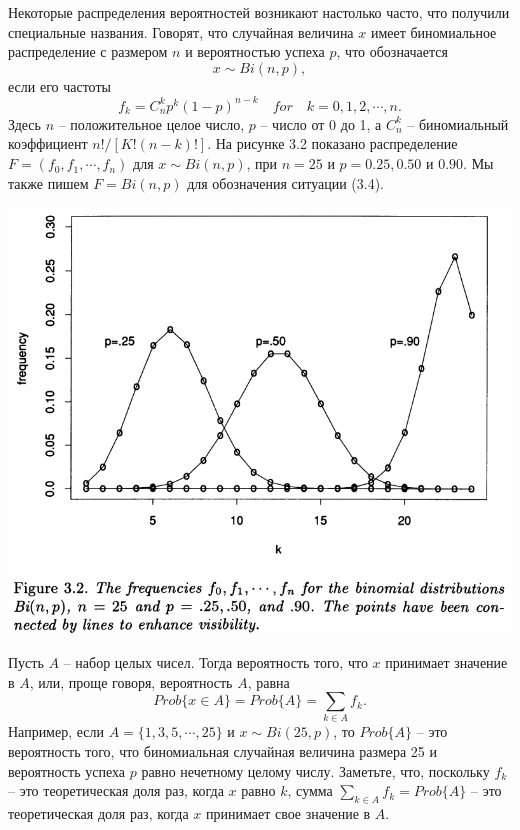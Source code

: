 Некоторые распределения вероятностей возникают настолько часто, что получили специальные названия. Говорят, что случайная величина $x$ имеет биномиальное распределение с размером $n$ и вероятностью успеха $p$, что обозначается 
\begin{equation}
    x\sim Bi(n,p),
\end{equation}
если его частоты 
\begin{equation}
    f_k=C_n^kp^k(1-p)^{n-k}\quad for\quad k=0,1,2,\cdots,n.
\end{equation}
Здесь $n$ -- положительное целое число, $p$ -- число от 0 до 1, а $C_n^k$ -- биномиальный коэффициент $n! / [K! (n-k)!]$. На рисунке 3.2 показано распределение $F = (f_0, f_1, \cdots, f_n)$ для $x \sim Bi (n, p)$, при $n = 25$ и $p = 0.25, 0.50$ и $0.90$. Мы также пишем $F = Bi (n, p)$ для обозначения ситуации (3.4). 
\newline

\noindent
\includegraphics[width=\linewidth]{2/f32.png}
\newline

Пусть $A$ -- набор целых чисел. Тогда вероятность того, что $x$ принимает значение в $A$, или, проще говоря, вероятность $A$, равна 
\begin{equation}
    Prob\{x\in A\}=Prob\{A\}=\sum_{k\in A}f_k.
\end{equation}
Например, если $A = \{1, 3, 5, \cdots, 25\}$ и $x \sim Bi (25, p)$, то $Prob \{A\}$ -- это вероятность того, что биномиальная случайная величина размера 25 и вероятность успеха $p$ равно нечетному целому числу. Заметьте, что, поскольку $f_k$ -- это теоретическая доля раз, когда $x$ равно $k$, сумма $\sum_{k\in A}f_k = Prob \{A\}$ -- это теоретическая доля раз, когда $x$ принимает свое значение в $A$. 

